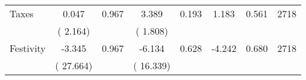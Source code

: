 \begin{tabular}{l*{7}{c}}
 Taxes       &              0.047       &        0.967  &              3.389       &        0.193  &              1.183       &              0.561 &  2718 \\ 
                       &       (       2.164)             &                               &       (       1.808)                     &                               &                                               &                                &                      \\ 

 Festivity       &             -3.345       &        0.967  &             -6.134       &        0.628  &             -4.242       &              0.680 &  2718 \\ 
                       &       (      27.664)             &                               &       (      16.339)                     &                               &                                               &                                &                      \\ 

\hline \end{tabular}